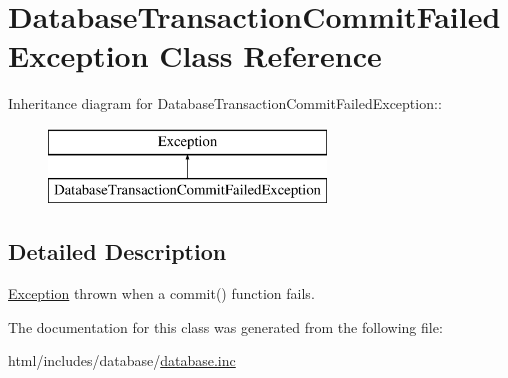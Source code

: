 \hypertarget{classDatabaseTransactionCommitFailedException}{
\section{DatabaseTransactionCommitFailedException Class Reference}
\label{classDatabaseTransactionCommitFailedException}
}
Inheritance diagram for DatabaseTransactionCommitFailedException::\begin{figure}[H]
\begin{center}
\leavevmode
\includegraphics[height=2cm]{classDatabaseTransactionCommitFailedException}
\end{center}
\end{figure}


\subsection{Detailed Description}
\hyperlink{classException}{Exception} thrown when a commit() function fails. 

The documentation for this class was generated from the following file:\begin{DoxyCompactItemize}
\item 
html/includes/database/\hyperlink{database_8inc}{database.inc}\end{DoxyCompactItemize}
